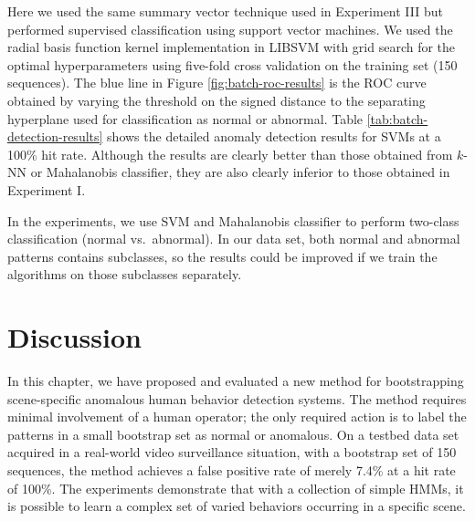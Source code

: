 Here we used the same summary vector technique used in Experiment III
but performed supervised classification using support vector
machines. We used the radial basis function kernel implementation in
LIBSVM  with grid search for the optimal
hyperparameters using five-fold cross validation on the training set
(150 sequences). The blue line in Figure \ref{fig:batch-roc-results}
is the ROC curve obtained by varying the threshold on the signed
distance to the separating hyperplane used for classification as
normal or abnormal.  Table \ref{tab:batch-detection-results} shows the
detailed anomaly detection results for SVMs at a 100\% hit rate.
Although the results are clearly better than those obtained from
$k$-NN or Mahalanobis classifier, they are also clearly inferior 
to those obtained in Experiment I.

In the experiments, we use SVM and Mahalanobis classifier to perform 
two-class classification (normal vs.\ abnormal). In our data set, 
both normal and abnormal patterns contains subclasses, so 
the results could be improved if we train the algorithms on those 
subclasses separately.


\section{Discussion}
\label{sec:batch-discussion}

In this chapter, we have proposed and evaluated a new method for
bootstrapping scene-specific anomalous human behavior detection
systems.  The method requires minimal involvement of a human operator;
the only required action is to label the patterns in a small bootstrap
set as normal or anomalous.  On a testbed data set acquired in a
real-world video surveillance situation, with a bootstrap set of 150
sequences, the method achieves a false positive rate of merely 7.4\%
at a hit rate of 100\%.  The experiments demonstrate that with a
collection of simple HMMs, it is possible to learn a complex set of
varied behaviors occurring in a specific scene.

